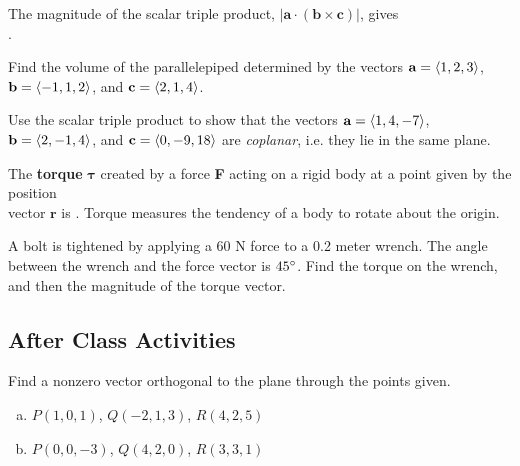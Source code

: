 \documentclass[notes]{subfiles}
\begin{document}
		\begin{rmk}
			The magnitude of the scalar triple product, $|\textbf{a}\cdot (\textbf{b}\times \textbf{c})|$, gives \\[15pt] .
		\end{rmk}
		
		\begin{ex}
			Find the volume of the parallelepiped determined by the vectors $\textbf{a} = \left\langle 1,2,3\right\rangle$, $\textbf{b} = \left\langle -1,1,2\right\rangle$, and $\textbf{c} = \left\langle 2,1,4\right\rangle$.
		\end{ex}
			\newpage
			
		\begin{ex}
			Use the scalar triple product to show that the vectors $\textbf{a} = \left\langle 1,4,-7\right\rangle$, $\textbf{b} = \left\langle 2,-1,4\right\rangle$, and $\textbf{c} = \left\langle 0,-9,18\right\rangle$ are \emph{coplanar}, i.e. they lie in the same plane.
		\end{ex}
			
		\begin{defn}[Torque]
			The \textbf{torque} $\mathbf{\tau}$ created by a force \textbf{F} acting on a rigid body at a point given by the position\\[15pt] vector $\textbf{r}$ is .  Torque measures the tendency of a body to rotate about the origin.
		\end{defn}
		
		\begin{ex}
			A bolt is tightened by applying a 60 N force to a 0.2 meter wrench.  The angle between the wrench and the force vector is $45^\circ$.  Find the torque on the wrench, and then the magnitude of the torque vector.
		\end{ex}
			
			\newpage
			
	\subsection*{After Class Activities}
		\begin{ex}
			Find a nonzero vector orthogonal to the plane through the points given.
			\begin{enumerate}[(a)]
				\item $P(1,0,1)$, $Q(-2,1,3)$, $R(4,2,5)$
					
				\item $P(0,0,-3)$, $Q(4,2,0)$, $R(3,3,1)$
			\end{enumerate}
		\end{ex}
		
\end{document}
